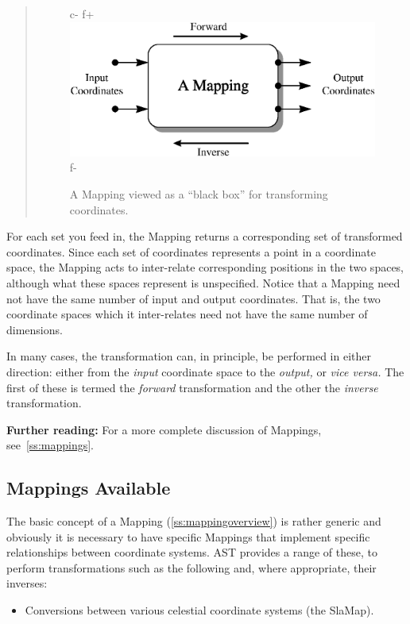 \documentclass[twoside,11pt]{article}
\newcommand{\secref}[1]{\S\ref{#1}}
\renewcommand{\secref}[1]{\ref{#1}}
\begin{document}
{\begin{htmlonly}
\begin{quote}
\begin{figure}[bhtp]
c-
f+
   \includegraphics[scale=1.2]{sun210_figures/mapping.eps}
f-
   \caption{A Mapping viewed as a ``black box'' for transforming coordinates.}
   \end{figure}
   \end{quote}
\end{htmlonly}
For each set you feed in, the Mapping returns a corresponding set of
transformed coordinates. Since each set of coordinates represents a
point in a coordinate space, the Mapping acts to inter-relate
corresponding positions in the two spaces, although what these spaces
represent is unspecified.  Notice that a Mapping need not have the
same number of input and output coordinates. That is, the two
coordinate spaces which it inter-relates need not have the same number
of dimensions.

In many cases, the transformation can, in principle, be performed in
either direction: either from the {\em{input}} coordinate space to the
{\em{output,}} or {\em{vice versa.}} The first of these is termed the
{\em{forward}} transformation and the other the {\em{inverse}}
transformation.

{\bf{Further reading:}} For a more complete discussion of Mappings,
see~\secref{ss:mappings}.

\subsection{\label{ss:mappingselection}Mappings Available}

The basic concept of a Mapping (\secref{ss:mappingoverview}) is rather
generic and obviously it is necessary to have specific Mappings that
implement specific relationships between coordinate systems. AST
provides a range of these, to perform transformations such as the
following and, where appropriate, their inverses:

\begin{itemize}
\item Conversions between various celestial coordinate systems (the
SlaMap).


\end{itemize}}
\end{document}
